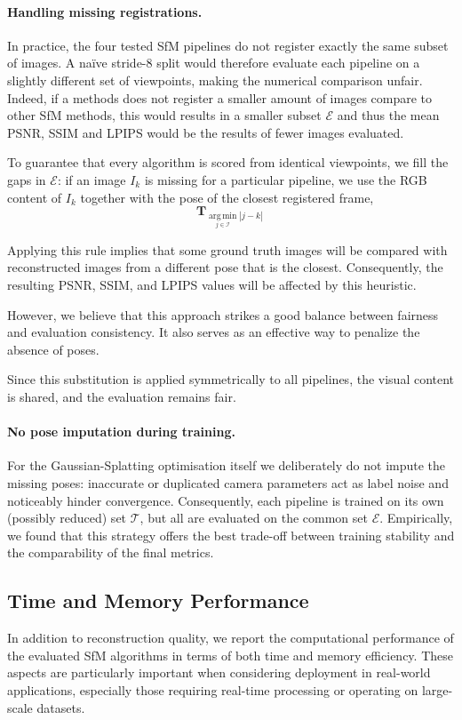 \paragraph{Handling missing registrations.}
In practice, the four tested SfM pipelines do not register exactly the same subset of images.  
A naïve stride-8 split would therefore evaluate each pipeline on a slightly different set of viewpoints, making the numerical comparison unfair.
Indeed, if a methods does not register a smaller amount of images compare to other SfM methods, this would results in a smaller subset $\mathcal{E}$ and thus the mean PSNR, SSIM and LPIPS would be the results of fewer images evaluated.

To guarantee that every algorithm is scored from identical viewpoints, we fill the gaps in $\mathcal{E}$: 
if an image $I_k$ is missing for a particular pipeline, we use the RGB content of $I_k$ together with the pose of the closest registered frame,
\begin{equation}
  \mathbf{T}_{\operatorname*{arg\,min}_{j\in\mathcal{I}} |j-k| }\,
\end{equation}

Applying this rule implies that some ground truth images will be compared with reconstructed images from a different pose that is the closest. 
Consequently, the resulting PSNR, SSIM, and LPIPS values will be affected by this heuristic.

However, we believe that this approach strikes a good balance between fairness and evaluation consistency. 
It also serves as an effective way to penalize the absence of poses.

Since this substitution is applied symmetrically to all pipelines, the visual content is shared, and the evaluation remains fair.

\paragraph{No pose imputation during training.}
For the Gaussian-Splatting optimisation itself we deliberately do not impute the missing poses: inaccurate or duplicated camera parameters act as label noise and noticeably hinder convergence. 
Consequently, each pipeline is trained on its own (possibly reduced) set $\mathcal{T}$, but all are evaluated on the common set $\mathcal{E}$. 
Empirically, we found that this strategy offers the best trade-off between training stability and the comparability of the final metrics.


\subsection{Time and Memory Performance}
In addition to reconstruction quality, we report the computational performance of the evaluated SfM algorithms in terms of both time and memory efficiency. 
These aspects are particularly important when considering deployment in real-world applications, especially those requiring real-time processing or operating on large-scale datasets.

